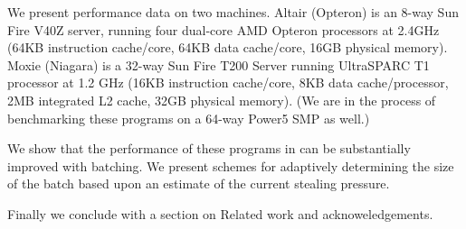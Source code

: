 We present performance data on two machines. Altair (Opteron) is an
8-way Sun Fire V40Z server, running four dual-core AMD Opteron
processors at 2.4GHz (64KB instruction cache/core, 64KB data
cache/core, 16GB physical memory). Moxie (Niagara) is a 32-way Sun
Fire T200 Server running UltraSPARC T1 processor at 1.2 GHz (16KB
instruction cache/core, 8KB data cache/processor, 2MB integrated L2
cache, 32GB physical memory). (We are in the process of benchmarking
these programs on a 64-way Power5 SMP as well.)


We show that the performance of these programs in \XWS{} can be
substantially improved with batching. We present schemes for
adaptively determining the size of the batch based upon an estimate of
the current stealing pressure.

Finally we conclude with a section on Related work and acknoweledgements.
